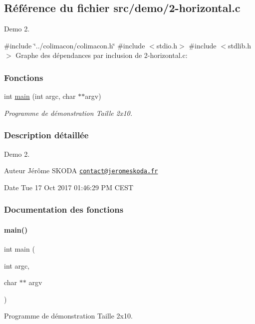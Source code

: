 \hypertarget{2-horizontal_8c}{}\subsection{Référence du fichier src/demo/2-\/horizontal.c}
\label{2-horizontal_8c}


Demo 2.  


{\ttfamily \#include \char`\"{}../colimacon/colimacon.\+h\char`\"{}}\newline
{\ttfamily \#include $<$stdio.\+h$>$}\newline
{\ttfamily \#include $<$stdlib.\+h$>$}\newline
Graphe des dépendances par inclusion de 2-\/horizontal.c\+:
\subsubsection*{Fonctions}
\begin{DoxyCompactItemize}
\item 
int \hyperlink{2-horizontal_8c_a3c04138a5bfe5d72780bb7e82a18e627}{main} (int argc, char $\ast$$\ast$argv)
\begin{DoxyCompactList}\small\item\em Programme de démonstration Taille 2x10. \end{DoxyCompactList}\end{DoxyCompactItemize}


\subsubsection{Description détaillée}
Demo 2. 

\begin{DoxyAuthor}{Auteur}
Jérôme S\+K\+O\+DA \href{mailto:contact@jeromeskoda.fr}{\tt contact@jeromeskoda.\+fr} 
\end{DoxyAuthor}
\begin{DoxyDate}{Date}
Tue 17 Oct 2017 01\+:46\+:29 PM C\+E\+ST 
\end{DoxyDate}


\subsubsection{Documentation des fonctions}
\mbox{\label{2-horizontal_8c_a3c04138a5bfe5d72780bb7e82a18e627}} 
\paragraph{\texorpdfstring{main()}{main()}}
{\footnotesize\ttfamily int main (\begin{DoxyParamCaption}\item[{int}]{argc,  }\item[{char $\ast$$\ast$}]{argv }\end{DoxyParamCaption})}



Programme de démonstration Taille 2x10. 

